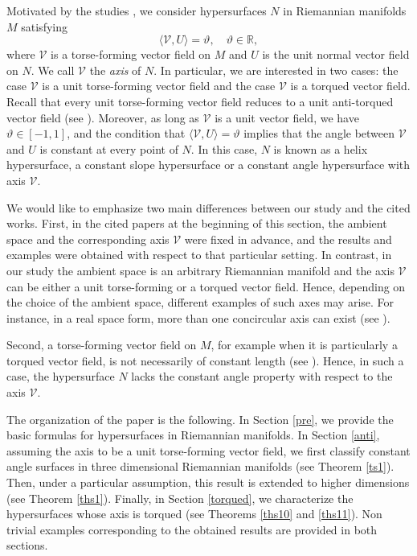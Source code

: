 \documentclass[12pt]{amsart}
\def\r{\mathbb R}
\def\v{\mathcal V}
\theoremstyle{definition}
\begin{document}
Motivated by the studies \cite{loy4,loy5}, we consider hypersurfaces $N$ in Riemannian manifolds $M$ satisfying 
\begin{equation}\label{intro1}
\langle \v,U\rangle=\vartheta, \quad \vartheta \in \r,
\end{equation}
where $\v$ is a torse-forming vector field on $M$ and $U$ is the unit normal vector field on $N$. We call $\v$ the {\it axis} of $N$. In particular, we are interested in two cases: the case $\v$ is a unit torse-forming vector field and the case $\v$ is a torqued vector field. Recall that every unit torse-forming vector field reduces to a unit anti-torqued vector field (see \cite[Proposition 3.6]{amc}). Moreover, as long as $\v$ is a unit vector field, we have $\vartheta \in [-1,1]$, and the condition that $\langle \v,U\rangle=\vartheta$ implies that the angle between $\v$ and $U$ is constant at every point of $N$. In this case, $N$ is known as a helix hypersurface, a constant slope hypersurface or a constant angle hypersurface with axis $\v$. 

We would like to emphasize two main differences between our study and the cited works. First, in the cited papers at the beginning of this section, the ambient space and the corresponding axis $\v$ were fixed in advance, and the results and examples were obtained with respect to that particular setting. In contrast, in our study the ambient space is an arbitrary Riemannian manifold and the axis $\v$ can be either a unit torse-forming or a torqued vector field. Hence, depending on the choice of the ambient space, different examples of such axes may arise. For instance, in a real space form, more than one concircular axis can exist (see \cite[Theorem 1]{loy5}).

Second, a torse-forming vector field on $M$, for example when it is particularly a torqued vector field, is not necessarily of constant length (see \cite[Proposition 3.2]{amc}). Hence, in such a case, the hypersurface $N$ lacks the constant angle property with respect to the axis $\v$.

The organization of the paper is the following. In Section \ref{pre}, we provide the basic formulas for hypersurfaces in Riemannian manifolds. In Section \ref{anti}, assuming the axis to be a unit torse-forming vector field, we first classify constant angle surfaces in three dimensional Riemannian manifolds (see Theorem \ref{ts1}). Then, under a particular assumption, this result is extended to higher dimensions (see Theorem \ref{ths1}). Finally, in Section \ref{torqued}, we characterize the hypersurfaces whose axis is torqued (see Theorems \ref{ths10} and \ref{ths11}). Non trivial examples corresponding to the obtained results are provided in both sections.
\end{document}

